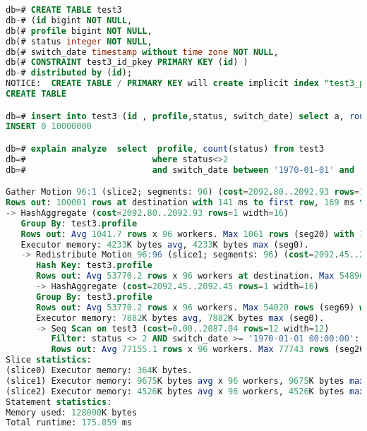 \begin{lstlisting}[language=SQL,label=lst:greenplum_example5,caption=SELECT с условиями]
db=# CREATE TABLE test3
db-# (id bigint NOT NULL,
db(# profile bigint NOT NULL,
db(# status integer NOT NULL,
db(# switch_date timestamp without time zone NOT NULL,
db(# CONSTRAINT test3_id_pkey PRIMARY KEY (id) )
db-# distributed by (id);
NOTICE:  CREATE TABLE / PRIMARY KEY will create implicit index "test3_pkey" for table "test3"
CREATE TABLE

db=# insert into test3 (id , profile,status, switch_date) select a, round(random()*100000), round(random()*4), now() - '1 year'::interval * round(random() * 40) from generate_series(1,10000000) a;
INSERT 0 10000000

db=# explain analyze  select  profile, count(status) from test3
db=#                         where status<>2
db=#                         and switch_date between '1970-01-01' and '2015-01-01'  group by profile;

Gather Motion 96:1 (slice2; segments: 96) (cost=2092.80..2092.93 rows=10 width=16)
Rows out: 100001 rows at destination with 141 ms to first row, 169 ms to end, start offset by 0.778 ms.
-> HashAggregate (cost=2092.80..2092.93 rows=1 width=16)
   Group By: test3.profile
   Rows out: Avg 1041.7 rows x 96 workers. Max 1061 rows (seg20) with 141 ms to end, start offset by 2.281 ms.
   Executor memory: 4233K bytes avg, 4233K bytes max (seg0).
   -> Redistribute Motion 96:96 (slice1; segments: 96) (cost=2092.45..2092.65 rows=1 width=16)
      Hash Key: test3.profile
      Rows out: Avg 53770.2 rows x 96 workers at destination. Max 54896 rows (seg20) with 71 ms to first row, 117 ms to end, start offset by 5.205 ms.
      -> HashAggregate (cost=2092.45..2092.45 rows=1 width=16)
      Group By: test3.profile
      Rows out: Avg 53770.2 rows x 96 workers. Max 54020 rows (seg69) with 71 ms to first row, 90 ms to end, start offset by 7.014 ms.
      Executor memory: 7882K bytes avg, 7882K bytes max (seg0).
      -> Seq Scan on test3 (cost=0.00..2087.04 rows=12 width=12)
         Filter: status <> 2 AND switch_date >= '1970-01-01 00:00:00'::timestamp without time zone AND switch_date <= '2015-01-01 00:00:00'::timestamp without time zone
         Rows out: Avg 77155.1 rows x 96 workers. Max 77743 rows (seg26) with 0.092 ms to first row, 31 ms to end, start offset by 7.881 ms.
Slice statistics:
(slice0) Executor memory: 364K bytes.
(slice1) Executor memory: 9675K bytes avg x 96 workers, 9675K bytes max (seg0).
(slice2) Executor memory: 4526K bytes avg x 96 workers, 4526K bytes max (seg0).
Statement statistics:
Memory used: 128000K bytes
Total runtime: 175.859 ms
\end{lstlisting}

